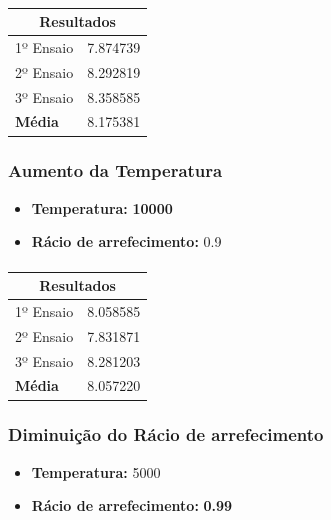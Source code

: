 \documentclass[a4paper]{article}
\begin{document}
\paragraph{}
\begin{center}
	\begin{tabular}{ |l|l| }
		\hline
		\multicolumn{2}{|c|}{Resultados} \\
		\hline
		1º Ensaio & 7.874739 \\
		2º Ensaio & 8.292819 \\
		3º Ensaio & 8.358585 \\
		\textbf{Média} & 8.175381 \\
		\hline
	\end{tabular}
\end{center}

\paragraph{}
\subsubsection{Aumento da Temperatura}
\begin{itemize}
	\item \textbf{Temperatura:} \textbf{10000}
	\item \textbf{Rácio de arrefecimento:} 0.9
\end{itemize}
\paragraph{}
\begin{center}
	\begin{tabular}{ |l|l| }
		\hline
		\multicolumn{2}{|c|}{Resultados} \\
		\hline
		1º Ensaio & 8.058585 \\
		2º Ensaio & 7.831871 \\
		3º Ensaio & 8.281203 \\
		\textbf{Média} & 8.057220 \\
		\hline
	\end{tabular}
\end{center}

\paragraph{}
\subsubsection{Diminuição do Rácio de arrefecimento}
\begin{itemize}
	\item \textbf{Temperatura:} 5000
	\item \textbf{Rácio de arrefecimento:} \textbf{0.99}
\end{itemize}
\end{document}
